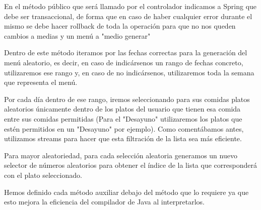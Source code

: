 \documentclass[12pt, a4paper, twoside]{book}
\begin{document}
	En el método público que será llamado por el controlador indicamos a Spring que debe ser transaccional, de forma que en caso de haber cualquier error durante el mismo se debe hacer rollback de toda la operación para que no nos queden cambios a medias y un menú a "medio generar"
	
	Dentro de este método iteramos por las fechas correctas para la generación del menú aleatorio, es decir, en caso de indicársenos un rango de fechas concreto, utilizaremos ese rango y, en caso de no indicársenos, utilizaremos toda la semana que representa el menú.
	
	Por cada día dentro de ese rango, iremos seleccionando para sus comidas platos aleatorios únicamente dentro de los platos del usuario que tienen esa comida entre sus comidas permitidas (Para el "Desayuno" utilizaremos los platos que estén permitidos en un "Desayuno" por ejemplo). Como comentábamos antes, utilizamos streams para hacer que esta filtración de la lista sea más eficiente.
	
	Para mayor aleatoriedad, para cada selección aleatoria generamos un nuevo selector de números aleatorios para obtener el índice de la lista que corresponderá con el plato seleccionado.
	
	Hemos definido cada método auxiliar debajo del método que lo requiere ya que esto mejora la eficiencia del compilador de Java al interpretarlos.
\end{document}
